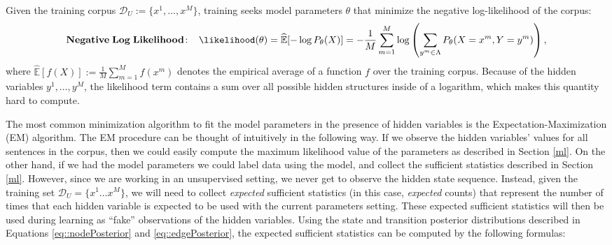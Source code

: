Given the training corpus $\mathcal{D}_{U} := \{x^1, \ldots, x^M\}$, training 
seeks model parameters $\theta$ that minimize the negative log-likelihood of the corpus:
\begin{equation}
\label{loglikelihoood}
\mathbf{Negative\;Log\;Likelihood\!:}\;\;\;\; \likelihood(\theta) = \widehat{\mathbb{E}} [-\log P_{\theta}(X)] = -\frac{1}{M}\sum_{m=1}^M \log \left( \sum_{y^m \in \Lambda} P_{\theta}(X=x^m,Y=y^m) \right),
\end{equation}
where $\widehat{\mathbb{E}}[f(X)] := \frac{1}{M}\sum_{m=1}^{M} f(x^m)$ denotes the empirical average of a function $f$ over the training corpus. Because of the hidden variables $y^1,\ldots,y^M$, the likelihood term contains a
sum over all possible hidden structures inside of a logarithm, which
makes this quantity hard to compute.

The most common minimization
algorithm to fit the model parameters in the presence of hidden
variables is the Expectation-Maximization (EM) algorithm. 
The EM procedure can be thought of intuitively in the following way. 
If we observe the hidden variables' values for all sentences in the
corpus, then we could easily compute the maximum likelihood value of
the parameters as described in Section \ref{ml}. 
On the other hand, if we had the model parameters we could label data
using the model, and collect the
sufficient statistics described in Section \ref{ml}.
However, since we are working in an unsupervised setting, we never get to
observe the hidden state sequence. Instead, given the 
training set $\mathcal{D}_{U} = \{x^1 \ldots x^M\}$, we will need to
collect \emph{expected} sufficient statistics (in this case, \emph{expected} counts) 
that
represent the number of times that each hidden variable is
expected to be used with the current parameters setting. These expected sufficient
statistics will then be used during learning as ``fake'' observations of
the hidden variables. Using the state and transition posterior distributions
described in Equations \ref{eq::nodePosterior} and \ref{eq::edgePosterior},
the expected sufficient statistics can 
be computed by the following formulas:


